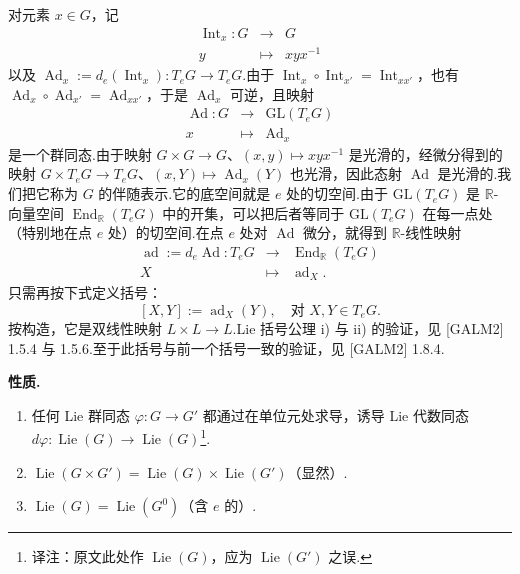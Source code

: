 \begin{numpara}[经由 $G$ 的伴随表示的微分]\label{np:ssl-1-3-2}
对元素 $x\in G$，记
\[
\begin{array}{rcl}
\operatorname{Int}_x\colon G &\longrightarrow& G\\
y &\longmapsto& xyx^{-1}
\end{array}
\]
以及 $\operatorname{Ad}_x:=d_e(\operatorname{Int}_x)\colon T_eG\longrightarrow T_eG$.由于 $\operatorname{Int}_x\circ\operatorname{Int}_{x'}=\operatorname{Int}_{xx'}$，也有 $\operatorname{Ad}_x\circ\operatorname{Ad}_{x'}=\operatorname{Ad}_{xx'}$，于是 $\operatorname{Ad}_x$ 可逆，且映射
\[
\begin{array}{rcl}
\operatorname{Ad}\colon G &\longrightarrow& \mathrm{GL}(T_eG)\\
x &\longmapsto& \operatorname{Ad}_x
\end{array}
\]
是一个群同态.由于映射 $G\times G\longrightarrow G$、$(x,y)\mapsto xyx^{-1}$ 是光滑的，经微分得到的映射 $G\times T_eG\longrightarrow T_eG$、$(x,Y)\mapsto\operatorname{Ad}_x(Y)$ 也光滑，因此态射 $\operatorname{Ad}$ 是光滑的.我们把它称为 $G$ 的伴随表示.它的底空间就是 $e$ 处的切空间.由于 $\mathrm{GL}(T_eG)$ 是 $\mathbb{R}$-向量空间 $\operatorname{End}_{\mathbb{R}}(T_eG)$ 中的开集，可以把后者等同于 $\mathrm{GL}(T_eG)$ 在每一点处（特别地在点 $e$ 处）的切空间.在点 $e$ 处对 $\operatorname{Ad}$ 微分，就得到 $\mathbb{R}$-线性映射
\[
\begin{array}{rcl}
\operatorname{ad}:=d_e\operatorname{Ad}\colon T_eG &\longrightarrow& \operatorname{End}_{\mathbb{R}}(T_eG)\\
X &\longmapsto& \operatorname{ad}_X .
\end{array}
\]
只需再按下式定义括号：
\[
[X,Y]:=\operatorname{ad}_X(Y),\quad\text{对 }X,Y\in T_eG .
\]
按构造，它是双线性映射 $L\times L\longrightarrow L$.Lie 括号公理 i) 与 ii) 的验证，见 [GALM2] 1.5.4 与 1.5.6.至于此括号与前一个括号一致的验证，见 [GALM2] 1.8.4.

\noindent\textbf{性质.}
\begin{enumerate}[label=\roman*)]
\item 任何 Lie 群同态 $\varphi\colon G\longrightarrow G'$ 都通过在单位元处求导，诱导 Lie 代数同态 $d\varphi\colon\operatorname{Lie}(G)\longrightarrow\operatorname{Lie}(G)$\footnote{译注：原文此处作 $\operatorname{Lie}(G)$，应为 $\operatorname{Lie}(G')$ 之误.}.
\item $\operatorname{Lie}(G\times G')=\operatorname{Lie}(G)\times\operatorname{Lie}(G')$（显然）.
\item $\operatorname{Lie}(G)=\operatorname{Lie}(G^{0})$（含 $e$ 的）.
\end{enumerate}


\end{numpara}
